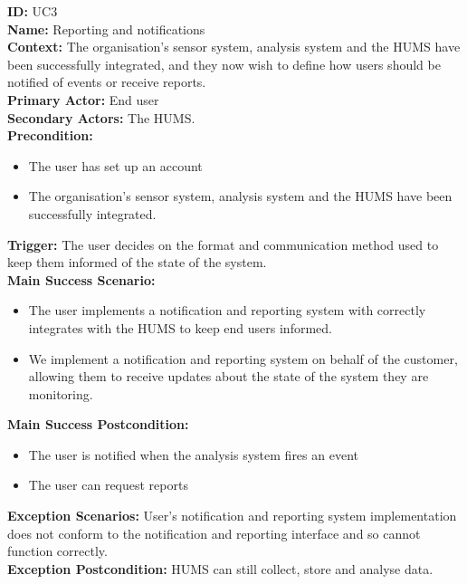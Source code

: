 \documentclass[10pt,a4paper]{article}
\begin{document}
\noindent \textbf{ID:} UC3\\
\textbf{Name:} Reporting and notifications\\
\textbf{Context:} The organisation's sensor system, analysis system and the HUMS have been successfully integrated, and they now wish to define how users should be notified of events or receive reports.\\
\textbf{Primary Actor:} End user\\
\textbf{Secondary Actors:} The HUMS.\\
\textbf{Precondition:}
\begin{itemize}
\item The user has set up an account
\item The organisation's sensor system, analysis system and the HUMS have been successfully integrated.
\end{itemize}
\textbf{Trigger:} The user decides on the format and communication method used to keep them informed of the state of the system.\\
\textbf{Main Success Scenario:}
\begin{itemize}
\item The user implements a notification and reporting system with correctly integrates with the HUMS to keep end users informed.
\item We implement a notification and reporting system on behalf of the customer, allowing them to receive updates about the state of the system they are monitoring.
\end{itemize}
\textbf{Main Success Postcondition:}
\begin{itemize}
\item The user is notified when the analysis system fires an event
\item The user can request reports
\end{itemize}
\textbf{Exception Scenarios:} User's notification and reporting system implementation does not conform to the notification and reporting interface and so cannot function correctly.\\
\textbf{Exception Postcondition:} HUMS can still collect, store and analyse data.
\end{document}
